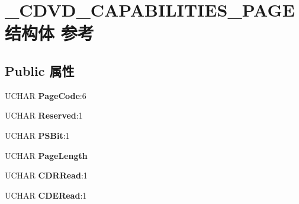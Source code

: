 \hypertarget{struct___c_d_v_d___c_a_p_a_b_i_l_i_t_i_e_s___p_a_g_e}{}\section{\+\_\+\+C\+D\+V\+D\+\_\+\+C\+A\+P\+A\+B\+I\+L\+I\+T\+I\+E\+S\+\_\+\+P\+A\+G\+E结构体 参考}
\label{struct___c_d_v_d___c_a_p_a_b_i_l_i_t_i_e_s___p_a_g_e}
\subsection*{Public 属性}
\begin{DoxyCompactItemize}
\item 
\mbox{\label{struct___c_d_v_d___c_a_p_a_b_i_l_i_t_i_e_s___p_a_g_e_a99dce35b11e93862c6b1227742b44a6c}} 
U\+C\+H\+AR {\bfseries Page\+Code}\+:6
\item 
\mbox{\label{struct___c_d_v_d___c_a_p_a_b_i_l_i_t_i_e_s___p_a_g_e_ac65d66169321f48c2c1ea56db24feda9}} 
U\+C\+H\+AR {\bfseries Reserved}\+:1
\item 
\mbox{\label{struct___c_d_v_d___c_a_p_a_b_i_l_i_t_i_e_s___p_a_g_e_a69bae73c00b2ecf2c96658ef47ca568a}} 
U\+C\+H\+AR {\bfseries P\+S\+Bit}\+:1
\item 
\mbox{\label{struct___c_d_v_d___c_a_p_a_b_i_l_i_t_i_e_s___p_a_g_e_afbde9443239866f6f697412dc973ef13}} 
U\+C\+H\+AR {\bfseries Page\+Length}
\item 
\mbox{\label{struct___c_d_v_d___c_a_p_a_b_i_l_i_t_i_e_s___p_a_g_e_ab47c4dfbd0338af6a0b609b5c44a53fc}} 
U\+C\+H\+AR {\bfseries C\+D\+R\+Read}\+:1
\item 
\mbox{\label{struct___c_d_v_d___c_a_p_a_b_i_l_i_t_i_e_s___p_a_g_e_a8264db608eabe6ab05c9b8f857515ae6}} 
U\+C\+H\+AR {\bfseries C\+D\+E\+Read}\+:1
\item 
\mbox{\label{struct___c_d_v_d___c_a_p_a_b_i_l_i_t_i_e_s___p_a_g_e_abaec9de22a82f43fc888aad420801b2b}} 

\end{DoxyCompactItemize}
